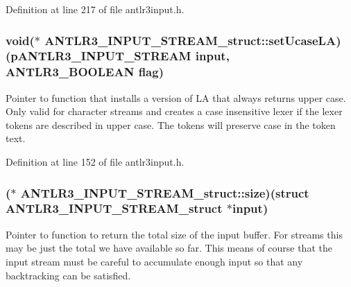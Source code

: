 Definition at line 217 of file antlr3input.\-h.

\hypertarget{struct_a_n_t_l_r3___i_n_p_u_t___s_t_r_e_a_m__struct_a7dfb77fa3d12dd66d9ea9bfe38c890a4}{
\subsubsection[{set\-Ucase\-L\-A}]{\setlength{\rightskip}{0pt plus 5cm}void($\ast$ A\-N\-T\-L\-R3\-\_\-\-I\-N\-P\-U\-T\-\_\-\-S\-T\-R\-E\-A\-M\-\_\-struct\-::set\-Ucase\-L\-A)({\bf p\-A\-N\-T\-L\-R3\-\_\-\-I\-N\-P\-U\-T\-\_\-\-S\-T\-R\-E\-A\-M} input, {\bf A\-N\-T\-L\-R3\-\_\-\-B\-O\-O\-L\-E\-A\-N} flag)}}\label{struct_a_n_t_l_r3___i_n_p_u_t___s_t_r_e_a_m__struct_a7dfb77fa3d12dd66d9ea9bfe38c890a4}
Pointer to function that installs a version of L\-A that always returns upper case. Only valid for character streams and creates a case insensitive lexer if the lexer tokens are described in upper case. The tokens will preserve case in the token text. 

Definition at line 152 of file antlr3input.\-h.

\hypertarget{struct_a_n_t_l_r3___i_n_p_u_t___s_t_r_e_a_m__struct_a52014f7dacdfa801db4c20a24a08f5b7}{
\subsubsection[{size}]{($\ast$ A\-N\-T\-L\-R3\-\_\-\-I\-N\-P\-U\-T\-\_\-\-S\-T\-R\-E\-A\-M\-\_\-struct\-::size)(struct {\bf A\-N\-T\-L\-R3\-\_\-\-I\-N\-P\-U\-T\-\_\-\-S\-T\-R\-E\-A\-M\-\_\-struct} $\ast$input)}}\label{struct_a_n_t_l_r3___i_n_p_u_t___s_t_r_e_a_m__struct_a52014f7dacdfa801db4c20a24a08f5b7}
Pointer to function to return the total size of the input buffer. For streams this may be just the total we have available so far. This means of course that the input stream must be careful to accumulate enough input so that any backtracking can be satisfied. 

